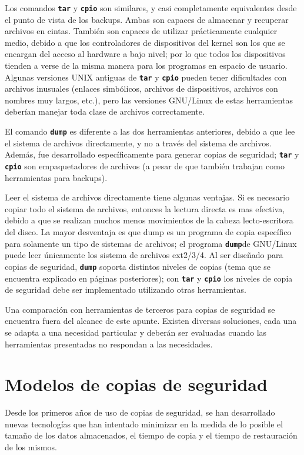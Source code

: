 \documentclass[12pt]{article}
\begin{document}
Los comandos \texttt{\textbf{tar}} y \texttt{\textbf{cpio}}
son similares, y casi completamente equivalentes desde el punto de 
vista de los backups. Ambas son capaces de almacenar y recuperar 
archivos en cintas. También son capaces de utilizar 
prácticamente cualquier medio, debido a que los controladores de 
dispositivos del kernel son los que se encargan del acceso al hardware a 
bajo nivel; por lo que todos los dispositivos
tienden a verse de la misma manera para los programas en espacio de usuario.
Algunas versiones  UNIX antiguas de \texttt{\textbf{tar}} y 
\texttt{\textbf{cpio}} pueden tener dificultades con archivos inusuales 
(enlaces simbólicos, archivos de dispositivos, archivos con nombres
muy largos, etc.), pero las versiones GNU/Linux de estas herramientas 
deberían manejar toda clase de archivos correctamente.

El comando \texttt{\textbf{dump}} es diferente a las dos herramientas 
anteriores, debido a que lee el sistema de archivos directamente, y no a 
través del sistema de archivos.  Además, fue desarrollado específicamente 
para generar copias de seguridad; \texttt{\textbf{tar}} y 
\texttt{\textbf{cpio}} son empaquetadores de archivos 
(a pesar de que también trabajan como herramientas para backups).

Leer el sistema de archivos directamente tiene algunas ventajas.
Si es necesario copiar todo el sistema de archivos, entonces la lectura 
directa es mas efectiva, debido a que se realizan muchos menos movimientos 
de la cabeza lecto-escritora del disco. La mayor desventaja es que dump es 
un programa de copia específico para solamente un tipo de sistemas de 
archivos; el programa \texttt{\textbf{dump}}de GNU/Linux puede leer 
únicamente los sistema de archivos ext2/3/4. Al ser diseñado para copias
de seguridad, \texttt{\textbf{dump}} soporta distintos niveles de copias
 (tema que se encuentra explicado en páginas posteriores); con 
\texttt{\textbf{tar}} y \texttt{\textbf{cpio}} los niveles de copia de 
seguridad debe ser implementado utilizando otras herramientas.

Una comparación con herramientas de terceros para copias de seguridad se 
encuentra fuera del alcance de este apunte. Existen diversas soluciones, 
cada una se adapta a una necesidad particular y deberán ser evaluadas 
cuando las herramientas presentadas no respondan a las necesidades. 

\section*{Modelos de copias de seguridad}
Desde los primeros años de uso de copias de seguridad, se han desarrollado 
nuevas tecnologías que han intentado minimizar en la medida de lo posible 
el tamaño de los datos almacenados, el tiempo de copia y el tiempo de 
restauración de los mismos.
\end{document}

